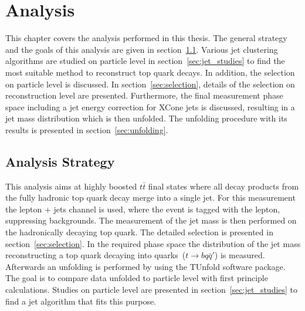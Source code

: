 \chapter{Analysis}
\label{ch:Ana}
	This chapter covers the analysis performed in this thesis. The general strategy and the goals of this analysis are given in section~\ref{sec:strategy}. Various jet clustering algorithms are studied on particle level in section~\ref{sec:jet_studies} to find the most suitable method to reconstruct top quark decays. In addition, the selection on particle level is discussed. In section~\ref{sec:selection}, details of the selection on reconstruction level are presented. Furthermore, the final measurement phase space including a jet energy correction for XCone jets is discussed, resulting in a jet mass distribution which is then unfolded. The unfolding procedure with its results is presented in section~\ref{sec:unfolding}.
	
\section{Analysis Strategy}
\label{sec:strategy}
	This analysis aims at highly boosted $t\bar{t}$ final states where all decay products from the fully hadronic top quark decay merge into a single jet. For this measurement the lepton + jets channel is used, where the event is tagged with the lepton, suppressing backgrounds. The measurement of the jet mass is then performed on the hadronically decaying top quark. The detailed selection is presented in section~\ref{sec:selection}. In the required phase space the distribution of the jet mass reconstructing a top quark decaying into quarks~($t\rightarrow b q \bar{q}'$) is measured. Afterwards an unfolding is performed by using the TUnfold \cite{tunfold} software package. The goal is to compare data unfolded to particle level with first principle calculations. Studies on particle level are presented in section~\ref{sec:jet_studies} to find a jet algorithm that fits this purpose.
	


